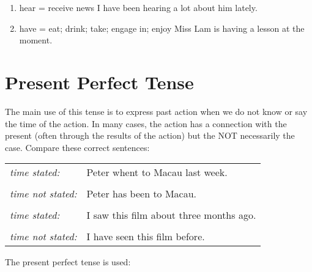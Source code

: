 \begin{enumerate}
\begin{enumerate}
\begin{enumerate}
                    \item hear = receive news
                        \newline
                        I have been hearing a lot about him lately.
                        \newline
                    \item have = eat; drink; take; engage in; enjoy
                        \newline
                        Miss Lam is having a lesson at the moment.
                        \newline
                \end{enumerate}
        \end{enumerate}
\end{enumerate}

\newpage
\section{Present Perfect Tense}
The main use of this tense is to express past action when we do not know or say
the time of the action.
In many cases, the action has a connection with the present (often through the
results of the action) but the NOT necessarily the case.
Compare these correct sentences:
\newline
\begin{tabular}{ll}
    \it{time stated:} & Peter whent to Macau last week. \\ & \\
    \it{time not stated:} & Peter has been to Macau. \\ & \\
    \it{time stated:} & I saw this film about three months ago. \\ & \\
    \it{time not stated:} & I have seen this film before.
\end{tabular}
\newline
\newline
The present perfect tense is used:
